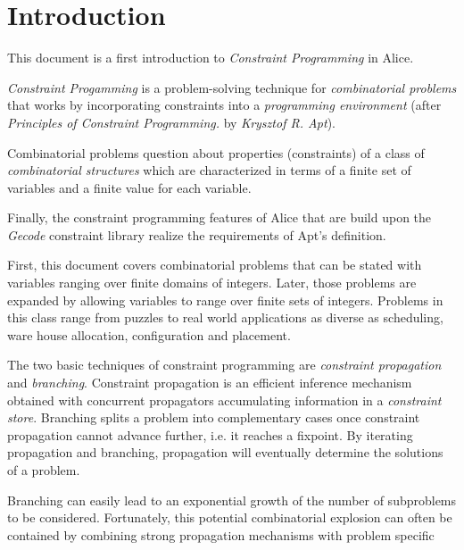 \documentclass[a4paper]{scrartcl}
\begin{document}
\newpage

\tableofcontents

\listoffigures

\lstlistoflistings


\newpage

\section{Introduction}
This document is a first introduction to {\it Constraint Programming}
in Alice.
\par
{\it Constraint Progamming } is a problem-solving technique for
{\it combinatorial problems} that works by 
incorporating constraints into a
{\it programming environment} (after \cite{3}
{\it Principles of Constraint Programming.} by 
{\it Krysztof R. Apt}).
\par
Combinatorial problems question about properties (constraints) of a
class of {\it combinatorial structures} which are characterized in
terms of a finite set of variables and a finite value for each
variable.
\par
Finally, the constraint programming features of Alice that are build
upon the {\it Gecode} \cite{12}
constraint library realize the
requirements of Apt's definition.
\par
First, this document covers combinatorial problems that can be
stated with variables ranging over finite domains of
integers. Later, those problems are expanded by allowing variables to
range over finite sets of integers.
Problems in this class range from puzzles to real world applications as 
diverse as scheduling, ware house allocation, configuration and placement.\\
\par
The two basic techniques of constraint programming are 
{\it constraint propagation} and 
{\it branching}. Constraint propagation is 
an efficient inference mechanism 
obtained with concurrent propagators accumulating information 
in a
{\it constraint store}. 
Branching splits a problem into complementary 
cases once constraint 
propagation cannot advance further, i.e. it reaches a fixpoint. 
By iterating propagation and branching, 
propagation will eventually determine the solutions of a problem.
\par
Branching can easily lead to an exponential 
growth of the number of 
subproblems to be considered. Fortunately, this potential 
combinatorial explosion can 
often be contained by combining strong propagation mechanisms 
with problem specific 
\end{document}
